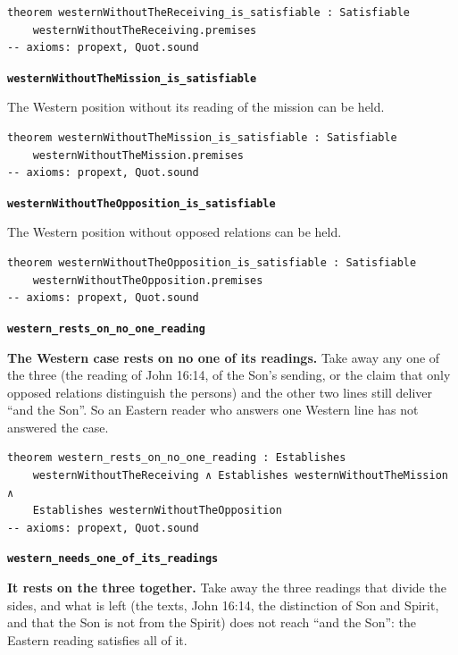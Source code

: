 \documentclass[11pt,paper=\testimonypaper,DIV=13,parskip=false]{scrartcl}
\begin{document}
{\small\begin{verbatim}
theorem westernWithoutTheReceiving_is_satisfiable : Satisfiable
    westernWithoutTheReceiving.premises
-- axioms: propext, Quot.sound
\end{verbatim}}
\par\medskip\noindent\textbf{\texttt{western\allowbreak{}Without\allowbreak{}The\allowbreak{}Mission\_\allowbreak{}is\_\allowbreak{}satisfiable}}\par\nobreak\noindent
The Western position without its reading of the mission can be held.

{\small\begin{verbatim}
theorem westernWithoutTheMission_is_satisfiable : Satisfiable
    westernWithoutTheMission.premises
-- axioms: propext, Quot.sound
\end{verbatim}}
\par\medskip\noindent\textbf{\texttt{western\allowbreak{}Without\allowbreak{}The\allowbreak{}Opposition\_\allowbreak{}is\_\allowbreak{}satisfiable}}\par\nobreak\noindent
The Western position without opposed relations can be held.

{\small\begin{verbatim}
theorem westernWithoutTheOpposition_is_satisfiable : Satisfiable
    westernWithoutTheOpposition.premises
-- axioms: propext, Quot.sound
\end{verbatim}}
\par\medskip\noindent\textbf{\texttt{western\_\allowbreak{}rests\_\allowbreak{}on\_\allowbreak{}no\_\allowbreak{}one\_\allowbreak{}reading}}\par\nobreak\noindent
\textbf{The Western case rests on no one of its readings.} Take away any one of the three (the reading of John 16:14, of the Son’s sending, or the claim that only opposed relations distinguish the persons) and the other two lines still deliver “and the Son”. So an Eastern reader who answers one Western line has not answered the case.

{\small\begin{verbatim}
theorem western_rests_on_no_one_reading : Establishes
    westernWithoutTheReceiving ∧ Establishes westernWithoutTheMission ∧
    Establishes westernWithoutTheOpposition
-- axioms: propext, Quot.sound
\end{verbatim}}
\par\medskip\noindent\textbf{\texttt{western\_\allowbreak{}needs\_\allowbreak{}one\_\allowbreak{}of\_\allowbreak{}its\_\allowbreak{}readings}}\par\nobreak\noindent
\textbf{It rests on the three together.} Take away the three readings that divide the sides, and what is left (the texts, John 16:14, the distinction of Son and Spirit, and that the Son is not from the Spirit) does not reach “and the Son”: the Eastern reading satisfies all of it.
\end{document}
